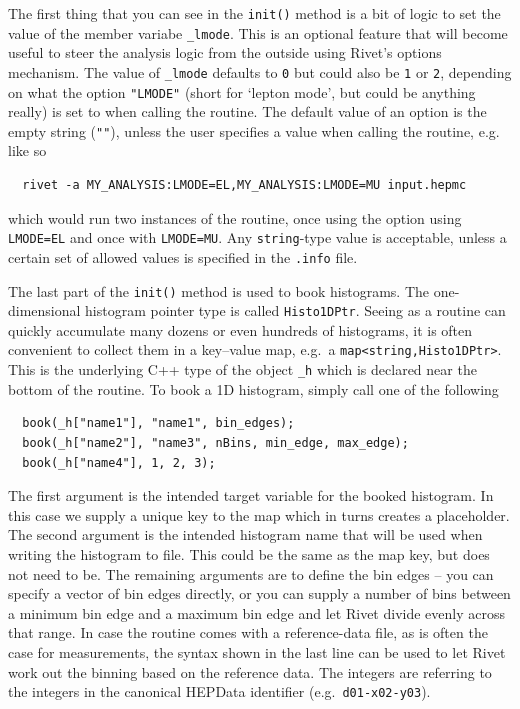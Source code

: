 \documentclass[10pt,fleqn]{scrartcl}
\theoremstyle{exstyle}
\begin{document}
The first thing that you can see in the \verb|init()| method is a bit of logic
to set the value of the member variabe \verb|_lmode|. 
This is an optional feature that will become useful to steer the analysis logic 
from the outside using Rivet's options mechanism. The value of \verb|_lmode| 
defaults to \verb|0| but could also be \verb|1| or \verb|2|, depending on what the option \verb|"LMODE"|
(short for `lepton mode', but could be anything really) is set to when calling the routine.
The default value of an option is the empty string (\verb|""|), unless the user specifies
a value when calling the routine, e.g. like so
\begin{verbatim}
  rivet -a MY_ANALYSIS:LMODE=EL,MY_ANALYSIS:LMODE=MU input.hepmc
\end{verbatim}
which would run two instances of the routine, once using the option using \verb|LMODE=EL| and
once with \verb|LMODE=MU|. Any \verb|string|-type value is acceptable, unless
a certain set of allowed values is specified in the \verb|.info| file.

The last part of the \verb|init()| method is used to book histograms. 
The one-dimensional histogram pointer type is called \verb|Histo1DPtr|.
Seeing as a routine can quickly accumulate many dozens or even hundreds
of histograms, it is often convenient to collect them in a key--value
map, e.g.\ a \verb|map<string,Histo1DPtr>|. This is the underlying
C++ type of the object \verb|_h| which is declared near the bottom of the routine.
To book a 1D histogram, simply call one of the following
\begin{verbatim}
  book(_h["name1"], "name1", bin_edges);
  book(_h["name2"], "name3", nBins, min_edge, max_edge);
  book(_h["name4"], 1, 2, 3);
\end{verbatim}
The first argument is the intended target variable for the booked histogram.
In this case we supply a unique key to the map which in turns creates a placeholder.
The second argument is the intended histogram name that will be used when
writing the histogram to file. This could be the same as the map key, 
but does not need to be. The remaining arguments are to define the bin edges
-- you can specify a vector of bin edges directly, or you can supply a number 
of bins between a minimum bin edge and a maximum bin edge and let Rivet divide 
evenly across that range.
In case the routine comes with a reference-data file, as is often the case
for measurements, the syntax shown in the last line can be used to let Rivet
work out the binning based on the reference data. The integers are referring
to the integers in the canonical HEPData identifier (e.g.\ \verb|d01-x02-y03|).
\end{document}
